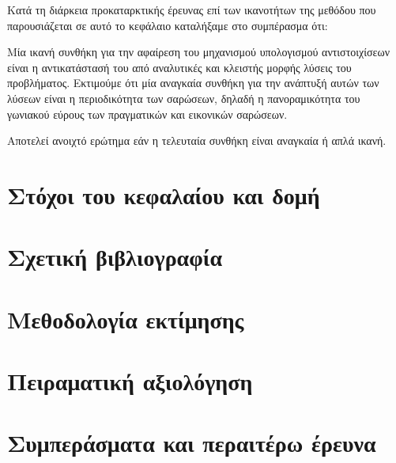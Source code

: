 Κατά τη διάρκεια προκαταρκτικής έρευνας επί των ικανοτήτων της μεθόδου που
παρουσιάζεται σε αυτό το κεφάλαιο καταλήξαμε στο συμπέρασμα ότι:

\begin{claim}
\label{claim:02_03:01}
  Μία ικανή συνθήκη για την αφαίρεση του μηχανισμού υπολογισμού αντιστοιχίσεων
  είναι η αντικατάστασή του από αναλυτικές και κλειστής μορφής λύσεις του
  προβλήματος. Εκτιμούμε ότι μία αναγκαία συνθήκη για την ανάπτυξή αυτών των
  λύσεων είναι η περιοδικότητα των σαρώσεων, δηλαδή η πανοραμικότητα του
  γωνιακού εύρους των πραγματικών και εικονικών σαρώσεων.
\end{claim}

Αποτελεί ανοιχτό ερώτημα εάν η τελευταία συνθήκη είναι αναγκαία ή απλά ικανή.

\section{Στόχοι του κεφαλαίου και δομή}
  \label{section:02_03_01}
  

\section{Σχετική βιβλιογραφία}
  \label{section:02_03_02}
  

\section{Μεθοδολογία εκτίμησης}
  \label{section:02_03_03}
  

\section{Πειραματική αξιολόγηση}
  \label{section:02_03_04}
  

\section{Συμπεράσματα και περαιτέρω έρευνα}
  \label{section:02_03_05}
  
